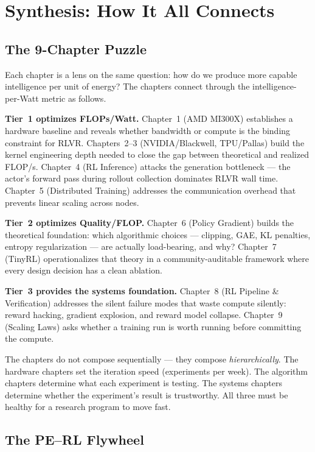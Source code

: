 \section{Synthesis: How It All Connects}

\subsection{The 9-Chapter Puzzle}

Each chapter is a lens on the same question: how do we produce more capable intelligence per unit of energy? The chapters connect through the intelligence-per-Watt metric as follows.

\textbf{Tier~1 optimizes FLOPs/Watt.} Chapter~1 (AMD MI300X) establishes a hardware baseline and reveals whether bandwidth or compute is the binding constraint for RLVR. Chapters~2--3 (NVIDIA/Blackwell, TPU/Pallas) build the kernel engineering depth needed to close the gap between theoretical and realized FLOP/s. Chapter~4 (RL Inference) attacks the generation bottleneck --- the actor's forward pass during rollout collection dominates RLVR wall time. Chapter~5 (Distributed Training) addresses the communication overhead that prevents linear scaling across nodes.

\textbf{Tier~2 optimizes Quality/FLOP.} Chapter~6 (Policy Gradient) builds the theoretical foundation: which algorithmic choices --- clipping, GAE, KL penalties, entropy regularization --- are actually load-bearing, and why? Chapter~7 (TinyRL) operationalizes that theory in a community-auditable framework where every design decision has a clean ablation.

\textbf{Tier~3 provides the systems foundation.} Chapter~8 (RL Pipeline \& Verification) addresses the silent failure modes that waste compute silently: reward hacking, gradient explosion, and reward model collapse. Chapter~9 (Scaling Laws) asks whether a training run is worth running before committing the compute.

The chapters do not compose sequentially --- they compose \textit{hierarchically}. The hardware chapters set the iteration speed (experiments per week). The algorithm chapters determine what each experiment is testing. The systems chapters determine whether the experiment's result is trustworthy. All three must be healthy for a research program to move fast.

\subsection{The PE--RL Flywheel}

